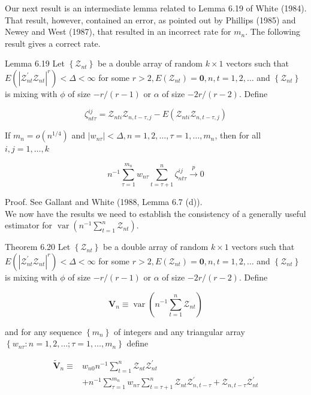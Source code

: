 \documentclass[10pt]{article}
\begin{document}
Our next result is an intermediate lemma related to Lemma 6.19 of White (1984). That result, however, contained an error, as pointed out by Phillips (1985) and Newey and West (1987), that resulted in an incorrect rate for $m_{n}$. The following result gives a correct rate.

Lemma 6.19 Let $\left\{\mathcal{Z}_{n t}\right\}$ be a double array of random $k \times 1$ vectors such that $E\left(\left|\boldsymbol{\mathcal { Z }}_{n t}^{\prime} \boldsymbol{\mathcal { Z }}_{n t}\right|^{r}\right)<\Delta<\infty$ for some $r>2, E\left(\boldsymbol{\mathcal { Z }}_{n t}\right)=\mathbf{0}, n, t=1,2, \ldots$ and $\left\{\mathcal{Z}_{n t}\right\}$ is mixing with $\phi$ of size $-r /(r-1)$ or $\alpha$ of size $-2 r /(r-2)$. Define

$$
\zeta_{n t \tau}^{i j}=\mathcal{Z}_{n t i} \mathcal{Z}_{n, t-\tau, j}-E\left(\mathcal{Z}_{n t i} \mathcal{Z}_{n, t-\tau, j}\right)
$$

If $m_{n}=o\left(n^{1 / 4}\right)$ and $\left|w_{n \tau}\right|<\Delta, n=1,2, \ldots, \tau=1, \ldots, m_{n}$, then for all $i, j=1, \ldots, k$

$$
n^{-1} \sum_{\tau=1}^{m_{n}} w_{n \tau} \sum_{t=\tau+1}^{n} \zeta_{n t \tau}^{i j} \xrightarrow{p} 0
$$

Proof. See Gallant and White (1988, Lemma 6.7 (d)).\\
We now have the results we need to establish the consistency of a generally useful estimator for $\operatorname{var}\left(n^{-1} \sum_{t=1}^{n} \mathcal{Z}_{n t}\right)$.

Theorem 6.20 Let $\left\{\mathcal{Z}_{n t}\right\}$ be a double array of random $k \times 1$ vectors such that $E\left(\left|\mathcal{Z}_{n t}^{\prime} \mathcal{Z}_{n t}\right|^{r}\right)<\Delta<\infty$ for some $r>2, E\left(\mathcal{Z}_{n t}\right)=\mathbf{0}, n, t=1,2, \ldots$ and $\left\{\mathcal{Z}_{n t}\right\}$ is mixing with $\phi$ of size $-r /(r-1)$ or $\alpha$ of size $-2 r /(r-2)$. Define

$$
\mathbf{V}_{n} \equiv \operatorname{var}\left(n^{-1} \sum_{t=1}^{n} \mathcal{Z}_{n t}\right)
$$

and for any sequence $\left\{m_{n}\right\}$ of integers and any triangular array $\left\{w_{n \tau}: n=\right. \left.1,2, \ldots ; \tau=1, \ldots, m_{n}\right\}$ define

$$
\begin{aligned}
\tilde{\mathbf{V}}_{n} \equiv & w_{n 0} n^{-1} \sum_{t=1}^{n} \mathcal{Z}_{n t} \mathcal{Z}_{n t}^{\prime} \\
& +n^{-1} \sum_{\tau=1}^{m_{n}} w_{n \tau} \sum_{t=\tau+1}^{n} \mathcal{Z}_{n t} \mathcal{Z}_{n, t-\tau}^{\prime}+\mathcal{Z}_{n, t-\tau} \mathcal{Z}_{n t}^{\prime}
\end{aligned}
$$
\end{document}

